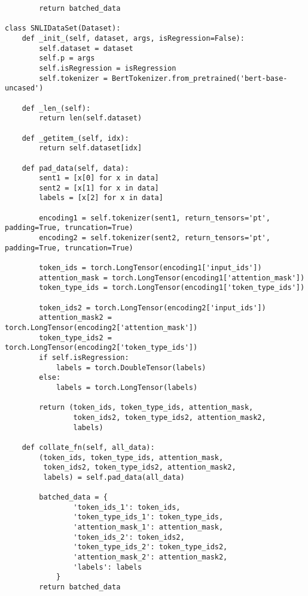 \begin{lstlisting}
        return batched_data

class SNLIDataSet(Dataset):
    def _init_(self, dataset, args, isRegression=False):
        self.dataset = dataset
        self.p = args
        self.isRegression = isRegression
        self.tokenizer = BertTokenizer.from_pretrained('bert-base-uncased')

    def _len_(self):
        return len(self.dataset)

    def _getitem_(self, idx):
        return self.dataset[idx]

    def pad_data(self, data):
        sent1 = [x[0] for x in data]
        sent2 = [x[1] for x in data]
        labels = [x[2] for x in data]

        encoding1 = self.tokenizer(sent1, return_tensors='pt', padding=True, truncation=True)
        encoding2 = self.tokenizer(sent2, return_tensors='pt', padding=True, truncation=True)

        token_ids = torch.LongTensor(encoding1['input_ids'])
        attention_mask = torch.LongTensor(encoding1['attention_mask'])
        token_type_ids = torch.LongTensor(encoding1['token_type_ids'])

        token_ids2 = torch.LongTensor(encoding2['input_ids'])
        attention_mask2 = torch.LongTensor(encoding2['attention_mask'])
        token_type_ids2 = torch.LongTensor(encoding2['token_type_ids'])
        if self.isRegression:
            labels = torch.DoubleTensor(labels)
        else:
            labels = torch.LongTensor(labels)

        return (token_ids, token_type_ids, attention_mask,
                token_ids2, token_type_ids2, attention_mask2,
                labels)

    def collate_fn(self, all_data):
        (token_ids, token_type_ids, attention_mask,
         token_ids2, token_type_ids2, attention_mask2,
         labels) = self.pad_data(all_data)

        batched_data = {
                'token_ids_1': token_ids,
                'token_type_ids_1': token_type_ids,
                'attention_mask_1': attention_mask,
                'token_ids_2': token_ids2,
                'token_type_ids_2': token_type_ids2,
                'attention_mask_2': attention_mask2,
                'labels': labels
            }
        return batched_data
\end{lstlisting}
